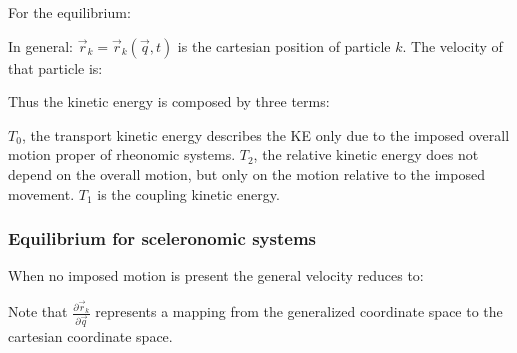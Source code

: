 \documentclass[10pt,a4paper]{scrartcl}
\begin{document}
\begin{multicols*}{2}

For the equilibrium:


In general: $\vec{r}_k=\vec{r}_k(\vec{q},t)$ is the cartesian position of particle $k$. The velocity of that particle is:


Thus the kinetic energy is composed by three terms:


$T_0$, the transport kinetic energy describes the KE only due to the imposed overall motion proper of rheonomic systems. $T_2$, the relative kinetic energy does not depend on the overall motion, but only on the motion relative to the imposed movement. $T_1$ is the coupling kinetic energy.

\subsubsection{Equilibrium for sceleronomic systems}

When no imposed motion is present the general velocity reduces to:


\begin{footnotesize}
Note that $\frac{\partial \vec{r}_k}{\partial \vec{q}}$ represents a mapping from the generalized coordinate space to the cartesian coordinate space.
\end{footnotesize}



\end{multicols*}
\end{document}
